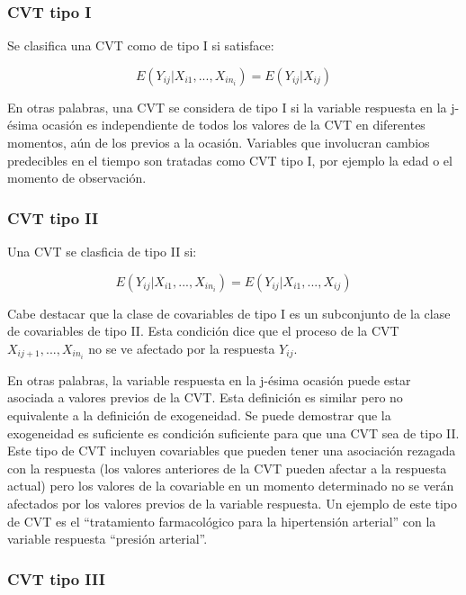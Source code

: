\documentclass[spanish]{article}
\numberwithin{figure}{subsection}
\numberwithin{equation}{subsection}
\numberwithin{table}{subsection}
\begin{document}
\subsubsection{CVT tipo I}

Se clasifica una CVT como de tipo I si satisface:

\begin{equation}
	\label{CVT tipo I}
	E(Y_{ij}|X_{i1}, ..., X_{in_i}) = E(Y_{ij}|X_{ij})
\end{equation}

En otras palabras, una CVT se considera de tipo I si la variable respuesta en la j-ésima ocasión es independiente de
todos los valores de la CVT en diferentes momentos, aún de los previos a la ocasión. Variables que involucran cambios
predecibles en el tiempo son tratadas como CVT tipo I, por ejemplo la edad o el momento de observación.

\subsubsection{CVT tipo II}

Una CVT se clasficia de tipo II si:

\begin{equation}
	\label{CVT tipo II}
	E(Y_{ij}|X_{i1}, ..., X_{in_i}) = E(Y_{ij}|X_{i1}, ..., X_{ij})
\end{equation}

Cabe destacar que la clase de covariables de tipo I es un subconjunto de la clase de covariables de tipo II. Esta
condición dice que el proceso de la CVT $X_{ij+1}, ..., X_{in_i}$ no se ve afectado por la respuesta $Y_{ij}$.

En otras palabras, la variable respuesta en la j-ésima ocasión puede estar asociada a valores previos de la CVT. Esta
definición es similar pero no equivalente a la definición de exogeneidad. Se puede demostrar que la exogeneidad es
suficiente es condición suficiente para que una CVT sea de tipo II. Este tipo de CVT incluyen covariables que pueden tener
una asociación rezagada con la respuesta (los valores anteriores de la CVT pueden afectar a la respuesta actual) pero los
valores de la covariable en un momento determinado no se verán afectados por los valores previos de la variable respuesta.
Un ejemplo de este tipo de CVT es el ``tratamiento farmacológico para la hipertensión arterial'' con la variable respuesta
``presión arterial''.

\subsubsection{CVT tipo III}
\end{document}
